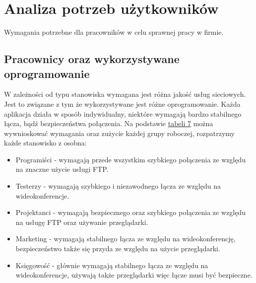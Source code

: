 \documentclass[a4paper,12pt]{extarticle}  %
\begin{document}
\section{Analiza potrzeb użytkowników}
Wymagania potrzebne dla pracowników w celu sprawnej pracy w firmie.
\subsection{Pracownicy oraz wykorzystywane oprogramowanie}
W zależności od typu stanowiska wymagana jest różna jakość usług sieciowych. Jest to związane z tym że wykorzystywane jest różne oprogramowanie. Każda aplikacja działa w sposób indywidualny, niektóre wymagają bardzo stabilnego łącza, bądź bezpieczeństwa połączenia.
Na podstawie \underline{\hyperref[tab:usage]{tabeli 7}} można wywnioskować wymagania oraz zużycie każdej grupy roboczej, rozpatrzymy każde stanowisko z osobna:
\begin{itemize}
	\item Programiści - wymagają przede wszystkim szybkiego połączenia ze względu na znaczne użycie usługi FTP.
	\item Testerzy - wymagają szybkiego i niezawodnego łącza ze względu na wideokonferencje.
	\item Projektanci - wymagają bezpiecznego oraz szybkiego połączenia ze względu na usługę FTP oraz używanie przeglądarki.
	\item Marketing - wymagają stabilnego łącza ze względu na wideokonferencję, bezpieczeństwo także się przyda ze względu na użycie przeglądarki.
	\item Księgowość - głównie wymagają stabilnego łącza ze względu na wideokonferencje, używają także przeglądarki więc łącze musi być bezpieczne.
\end{itemize}
\end{document}
